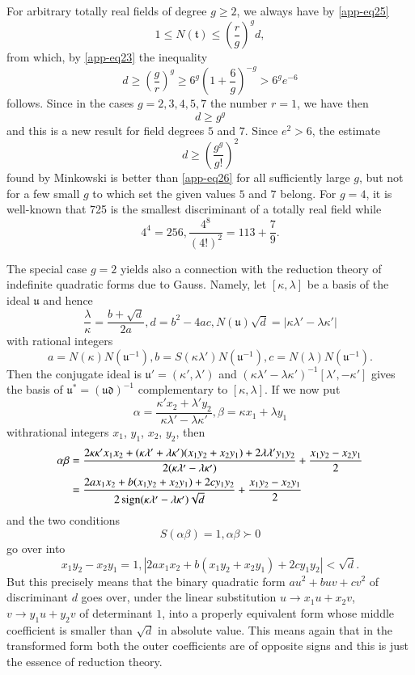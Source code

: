 For arbitrary totally real fields of degree $g\geq 2$, we always have
by \eqref{app-eq25} 
$$
1\leq N(\mathfrak{t})\leq \left(\frac{r}{g}\right)^{g}d,
$$\pageoriginale
from which, by \eqref{app-eq23} the inequality
\begin{equation*}
d\geq \left(\frac{g}{r}\right)^{g}\geq
6^{g}\left(1+\frac{6}{g}\right)^{-g}>6^{g}e^{-6}\tag{26}\label{app-eq26} 
\end{equation*}
follows. Since in the cases $g=2,3,4,5,7$ the number $r=1$, we have
then
$$
d\geq g^{g}
$$
and this is a new result for field degrees $5$ and $7$. Since
$e^{2}>6$, the estimate
$$
d\geq \left(\frac{g^{g}}{g!}\right)^{2}
$$
found by Minkowski is better than \eqref{app-eq26} for all
sufficiently large $g$, but not for a few small $g$ to which set the
given values $5$ and $7$ belong. For $g=4$, it is well-known that 725
is the smallest discriminant of a totally real field while
$$
4^{4}=256, \frac{4^{8}}{(4!)^{2}}=113+\frac{7}{9}.
$$

The special case $g=2$ yields also a connection with the reduction
theory of indefinite quadratic forms due to Gauss. Namely, let
$[\kappa,\lambda]$ be a basis of the ideal $\mathfrak{u}$ and hence
$$
\frac{\lambda}{\kappa}=\frac{b+\sqrt{d}}{2a}, d=b^{2}-4ac,
N(\mathfrak{u})\sqrt{d}=|\kappa \lambda'-\lambda \kappa'|
$$
with rational integers
$$
a=N(\kappa)N(\mathfrak{u}^{-1}),
b=S(\kappa\lambda')N(\mathfrak{u}^{-1}),
c=N(\lambda)N(\mathfrak{u}^{-1}).
$$
Then the conjugate ideal is $\mathfrak{u}'=(\kappa',\lambda')$ and
$(\kappa\lambda'-\lambda\kappa')^{-1}[\lambda',-\kappa']$ gives the
basis of $\mathfrak{u}^{\ast}=(\mathfrak{ud})^{-1}$ complementary to
$[\kappa,\lambda]$. If we now put
$$
\alpha=\frac{\kappa'x_{2}+\lambda'y_{2}}{\kappa\lambda'-\lambda\kappa'},\beta=\kappa
x_{1}+\lambda y_{1}
$$
with\pageoriginale rational integers $x_{1}$, $y_{1}$, $x_{2}$,
$y_{2}$, then
\begin{align*}
\alpha\beta &=
\frac{2\kappa\kappa'x_{1}x_{2}+(\kappa\lambda'+\lambda\kappa')(x_{1}y_{2}+x_{2}y_{1})+2\lambda\lambda'y_{1}y_{2}}{2(\kappa\lambda'-\lambda\kappa')}+\frac{x_{1}y_{2}-x_{2}y_{1}}{2}\\
&=
\frac{2ax_{1}x_{2}+b(x_{1}y_{2}+x_{2}y_{1})+2cy_{1}y_{2}}{2\operatorname{sign}(\kappa\lambda'-\lambda\kappa')\sqrt{d}}+\frac{x_{1}y_{2}-x_{2}y_{1}}{2} 
\end{align*}
and the two conditions
$$
S(\alpha\beta)=1,\alpha\beta \succ 0
$$
go over into
$$
x_{1}y_{2}-x_{2}y_{1}=1,|2ax_{1}x_{2}+b(x_{1}y_{2}+x_{2}y_{1})+2cy_{1}y_{2}|<\sqrt{d}.
$$
But this precisely means that the binary quadratic form
$au^{2}+buv+cv^{2}$ of discriminant $d$ goes over, under the linear
substitution $u\to x_{1}u+x_{2}v$, $v\to y_{1}u+y_{2}v$ of determinant
$1$, into a properly equivalent form whose middle coefficient is
smaller than $\sqrt{d}$ in absolute value. This means again that in
the transformed form both the outer coefficients are of opposite signs
and this is just the essence of reduction theory.

